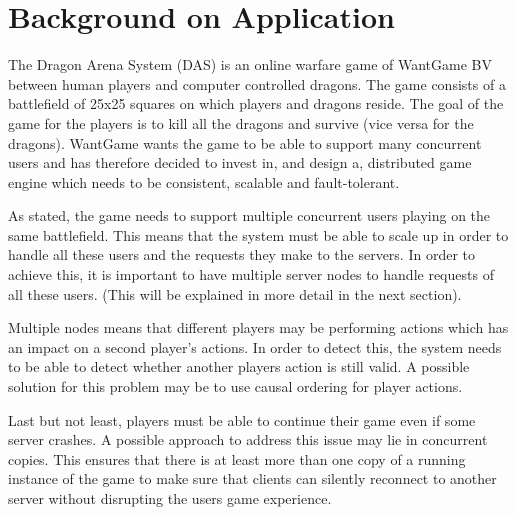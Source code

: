 \section{Background on Application }


The Dragon Arena System (DAS) is an online warfare game of WantGame BV between human players and computer controlled dragons.
The game consists of a battlefield of 25x25 squares on which players and dragons reside.
The goal of the game for the players is to kill all the dragons and survive (vice versa for the dragons).
WantGame wants the game to be able to support many concurrent users and has therefore decided to invest in, and design a, distributed game engine which needs to be consistent, scalable and fault-tolerant. 

As stated, the game needs to support multiple concurrent users playing on the same battlefield. 
This means that the system must be able to scale up in order to handle all these users and the requests they make to the servers. 
In order to achieve this, it is important to have multiple server nodes to handle requests of all these users. 
(This will be explained in more detail in the next section).

Multiple nodes means that different players may be performing actions which has an impact on a second player's actions.
In order to detect this, the system needs to be able to detect whether another players action is still valid. 
A possible solution for this problem may be to use causal ordering for player actions. %

Last but not least, players must be able to continue their game even if some server crashes. 
A possible approach to address this issue may lie in concurrent copies. %
This ensures that there is at least more than one copy of a running instance of the game to make sure that clients can silently reconnect to another server without disrupting the users game experience. 
